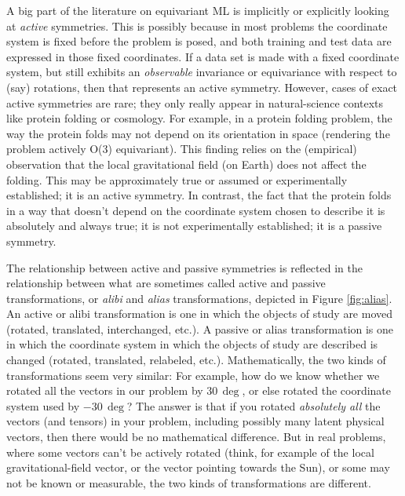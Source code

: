 \documentclass{article}
\theoremstyle{plain}
\theoremstyle{definition}
\theoremstyle{remark}
\begin{document}
A big part of the literature on equivariant ML is implicitly or explicitly looking at \emph{active} symmetries.
This is possibly because in most problems the coordinate system is fixed before the problem is posed, and both training and test data are expressed in those fixed coordinates.
If a data set is made with a fixed coordinate system, but still exhibits an {\em observable} invariance or equivariance with respect to (say) rotations, then that represents an active symmetry.
However, cases of exact active symmetries are rare; they only really appear in natural-science contexts like protein folding or cosmology.
For example, in a protein folding problem, the way the protein folds may not depend on its orientation in space (rendering the problem actively O(3) equivariant).
This finding relies on the (empirical) observation that the local gravitational field (on Earth) does not affect the folding.
This may be approximately true or assumed or experimentally established; it is an active symmetry.
In contrast, the fact that the protein folds in a way that doesn't depend on the coordinate system chosen to describe it is absolutely and always true; it is not experimentally established; it is a passive symmetry.

The relationship between active and passive symmetries is reflected in the relationship between what are sometimes called active and passive transformations, or \emph{alibi} and \emph{alias} transformations, depicted in Figure \ref{fig:alias}.
An active or alibi transformation is one in which the objects of study are moved (rotated, translated, interchanged, etc.).
A passive or alias transformation is one in which the coordinate system in which the objects of study are described is changed (rotated, translated, relabeled, etc.).
Mathematically, the two kinds of transformations seem very similar:
For example, how do we know whether we rotated all the vectors in our problem by $30\,\deg$, or else rotated the coordinate system used by $-30\,\deg$?
The answer is that if you rotated \emph{absolutely all} the vectors (and tensors) in your problem, including possibly many latent physical vectors, then there would be no mathematical difference.
But in real problems, where some vectors can't be actively rotated (think, for example of the local gravitational-field vector, or the vector pointing towards the Sun), or some may not be known or measurable, the two kinds of transformations are different.
\end{document}
